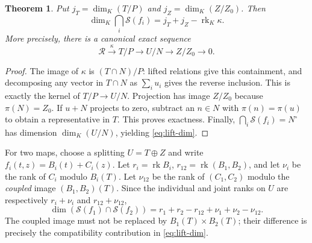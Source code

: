 \documentclass[12pt,letterpaper,onecolumn]{article}
\newtheorem{theorem}{Theorem}
\theoremstyle{definition}
\begin{document}
\begin{theorem}\label{thm:lifting}
Put $j_T=\dim_K(T/P)$ and $j_Z=\dim_K(Z/Z_0)$. Then
\begin{equation}
 \dim_K\bigcap_i\mathcal S(f_i)
 =j_T+j_Z-\operatorname{rk}_K\kappa.
 \label{eq:lift-dim}
\end{equation}
More precisely, there is a canonical exact sequence
\begin{equation}
 \mathcal R\xrightarrow{\kappa}T/P\longrightarrow U/N
 \longrightarrow Z/Z_0\longrightarrow0.
 \label{eq:exact}
\end{equation}
\end{theorem}
\begin{proof}
The image of $\kappa$ is $(T\cap N)/P$: lifted relations give this containment, and decomposing any vector in $T\cap N$ as $\sum_i u_i$ gives the reverse inclusion. This is exactly the kernel of $T/P\to U/N$. Projection has image $Z/Z_0$ because $\pi(N)=Z_0$. If $u+N$ projects to zero, subtract an $n\in N$ with $\pi(n)=\pi(u)$ to obtain a representative in $T$. This proves exactness. Finally, $\bigcap_i\mathcal S(f_i)=N^\circ$ has dimension $\dim_K(U/N)$, yielding \eqref{eq:lift-dim}.
\end{proof}

For two maps, choose a splitting $U=T\oplus Z$ and write $f_i(t,z)=B_i(t)+C_i(z)$. Let $r_i=\operatorname{rk}B_i$, $r_{12}=\operatorname{rk}(B_1,B_2)$, and let $\nu_i$ be the rank of $C_i$ modulo $B_i(T)$. Let $\nu_{12}$ be the rank of $(C_1,C_2)$ modulo the \emph{coupled} image $(B_1,B_2)(T)$. Since the individual and joint ranks on $U$ are respectively $r_i+\nu_i$ and $r_{12}+\nu_{12}$,
\begin{equation}
 \dim(\mathcal S(f_1)\cap\mathcal S(f_2))
 =r_1+r_2-r_{12}+\nu_1+\nu_2-\nu_{12}.
 \label{eq:joint}
\end{equation}
The coupled image must not be replaced by $B_1(T)\times B_2(T)$; their difference is precisely the compatibility contribution in \eqref{eq:lift-dim}.
\end{document}
